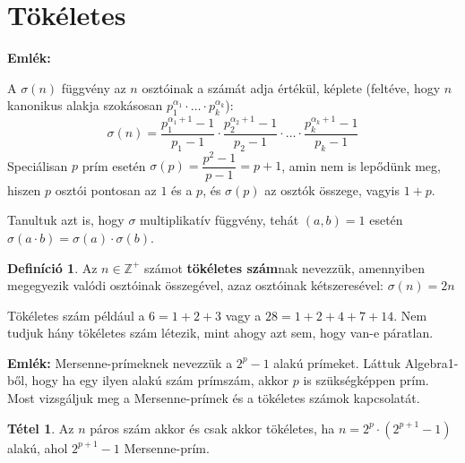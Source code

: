\documentclass[12pt]{book}
\theoremstyle{plain} %
\theoremstyle{definition} %
\newtheorem{defi/}{Definíció}[section]
\newenvironment{defi}
  {\renewcommand{\qedsymbol}{$\clubsuit$}%
   \pushQED{\qed}\begin{defi/}}
  {\popQED\end{defi/}}
\newtheorem{theo/}{Tétel}[section]
\newenvironment{theo}
  {\renewcommand{\qedsymbol}{$\clubsuit$}%
   \pushQED{\qed}\begin{theo/}}
  {\popQED\end{theo/}}
\theoremstyle{remark}
\renewcommand\qedsymbol{$\blacksquare$}
\numberwithin{equation}{section}  %
\def\Z{\mathbb{Z}}
\begin{document}
	\section{Tökéletes}
	
	\textbf{Emlék: }
	
	A $\sigma(n)$ függvény az $n$ osztóinak a számát adja értékül, képlete (feltéve, hogy $n$ kanonikus alakja szokásosan $p_1^{\alpha_1} \cdot \ldots \cdot p_k^{\alpha_k}$):
	\[ \sigma(n) = \dfrac{p_1^{\alpha_1+1}-1}{p_1 -1} \cdot \dfrac{p_2^{\alpha_2+1}-1}{p_2 -1} \cdot \ldots \cdot \dfrac{p_k^{\alpha_k+1}-1}{p_k -1} \]
	Speciálisan $p$ prím esetén $\sigma(p) = \dfrac{p^2-1}{p-1} = p+1$, amin nem is lepődünk meg, hiszen $p$ osztói pontosan az $1$ és a $p$, és $\sigma(p)$ az osztók összege, vagyis $1+p$.
	
	Tanultuk azt is, hogy $\sigma$ multiplikatív függvény, tehát $(a,b)=1$ esetén $\sigma(a\cdot b)= \sigma(a)\cdot \sigma(b)$.
	
	\begin{defi}
		Az $n\in \Z^{+}$ számot \textbf{tökéletes szám}nak nevezzük, amennyiben megegyezik valódi osztóinak összegével, azaz osztóinak kétszeresével: $\sigma(n) = 2n$
	\end{defi}

	Tökéletes szám például a $6=1+2+3$ vagy a $28=1+2+4+7+14$. Nem tudjuk hány tökéletes szám létezik, mint ahogy azt sem, hogy van-e páratlan.

	\textbf{Emlék:} Mersenne-prímeknek nevezzük a $2^p-1$ alakú prímeket. Láttuk Algebra1-ből, hogy ha egy ilyen alakú szám prímszám, akkor $p$ is szükségképpen prím. Most vizsgáljuk meg a Mersenne-prímek és a tökéletes számok kapcsolatát.
	
	\begin{theo}
		Az $n$ páros szám akkor és csak akkor tökéletes, ha $n=2^p\cdot (2^{p+1} - 1)$ alakú, ahol $2^{p+1}-1$ Mersenne-prím.
	\end{theo}
\end{document}
